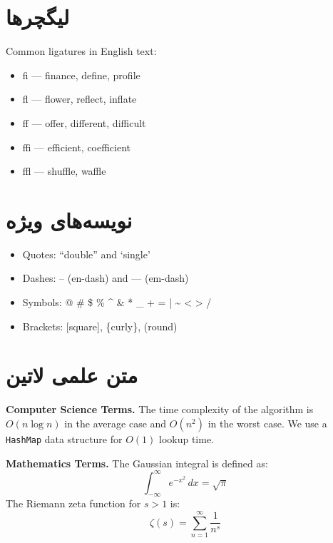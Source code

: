 \documentclass{matinbook}
\begin{document}
\section{لیگچرها}
\label{sec:font-latin-ligatures}

\begin{latin}
Common ligatures in English text:

\begin{itemize}
    \item fi --- finance, define, profile
    \item fl --- flower, reflect, inflate
    \item ff --- offer, different, difficult
    \item ffi --- efficient, coefficient
    \item ffl --- shuffle, waffle
\end{itemize}
\end{latin}

\section{نویسه‌های ویژه}
\label{sec:font-latin-special}

\begin{latin}
\begin{itemize}
    \item Quotes: ``double'' and `single'
    \item Dashes: -- (en-dash) and --- (em-dash)
    \item Symbols: @ \# \$ \% \^{} \& * \_ + = | \~{} < > /
    \item Brackets: [square], \{curly\}, (round)
\end{itemize}
\end{latin}

\section{متن علمی لاتین}
\label{sec:font-latin-scientific}

\begin{latin}
\textbf{Computer Science Terms.}
The time complexity of the algorithm is \(O(n \log n)\) in the
average case and \(O(n^2)\) in the worst case. We use a
\texttt{HashMap} data structure for \(O(1)\) lookup time.

\textbf{Mathematics Terms.}
The Gaussian integral is defined as:
\[\int_{-\infty}^{\infty} e^{-x^2}\,dx = \sqrt{\pi}\]
The Riemann zeta function for \(s > 1\) is:
\[\zeta(s) = \sum_{n=1}^{\infty} \frac{1}{n^s}\]
\end{latin}
\end{document}
